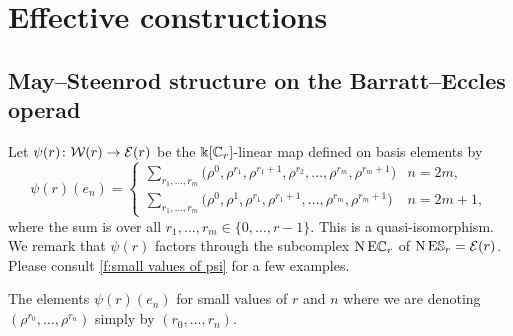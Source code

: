 
\section{Effective constructions}

\subsection{May--Steenrod structure on the Barratt--Eccles operad}

Let $\psi(r) \colon \mathcal{W}(r) \to \mathcal{E}(r)$ be the $\Bbbk[\mathbb{C}_r]$-linear map defined on basis elements by
\begin{equation*}
	\psi(r)(e_{n}) = \begin{cases}
		\displaystyle{\sum_{r_1, \dots, r_m}} \big(\rho^0, \rho^{r_1}, \rho^{r_1+1}, \rho^{r_2}, \dots, \rho^{r_{m}}, \rho^{r_{m}+1} \big) & n = 2m, \\
		\displaystyle{\sum_{r_1, \dots, r_m}} \big(\rho^0, \rho^1, \rho^{r_1}, \rho^{r_1+1}, \dots, \rho^{r_{m}}, \rho^{r_{m}+1} \big) & n = 2m+1,
	\end{cases}
\end{equation*}
where the sum is over all $r_1, \dots, r_m \in \{0, \dots, r-1\}$.
This is a quasi-isomorphism.
We remark that $\psi(r)$ factors through the subcomplex $\operatorname{N}\mathrm{E}\mathbb{C}_r$ of $\operatorname{N}\mathrm{E}\mathbb{S}_r = \mathcal{E}(r)$.
Please consult \cref{f:small values of psi} for a few examples.

\begin{table}
	\centering
	
	\caption{The elements $\psi(r)(e_n)$ for small values of $r$ and $n$ where we are denoting $(\rho^{r_0}, \dots, \rho^{r_n})$ simply by $(r_0, \dots, r_n)$.}
	\label{f:small values of psi}
\end{table}